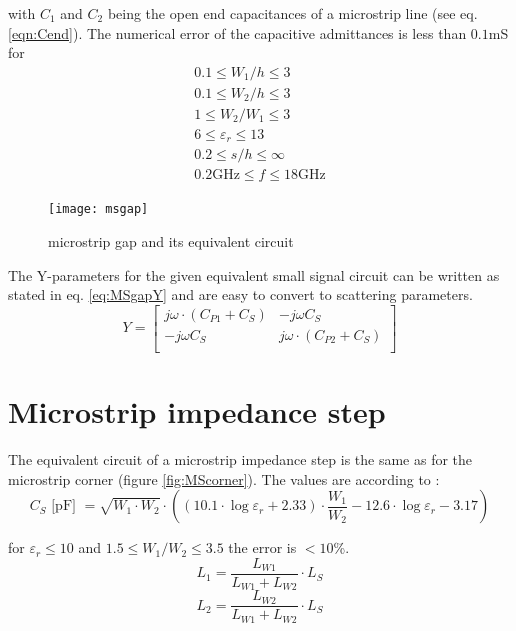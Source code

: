 \documentclass[10pt]{report}
\begin{document}
with $C_1$ and $C_2$ being the open end capacitances of a microstrip
line (see eq. \eqref{eqn:Cend}).  The numerical error of the
capacitive admittances is less than $0.1$mS for
\begin{equation*}
\begin{split}
0.1\le W_1/h \le 3 \\
0.1\le W_2/h \le 3 \\
1\le W_2/W_1 \le 3 \\
6\le \varepsilon_r \le 13 \\
0.2\le s/h \le \infty \\
0.2\text{GHz} \le f \le 18\text{GHz}
\end{split}
\end{equation*}

\begin{figure}[ht]
\begin{center}
\texttt{[image: msgap]}
\end{center}
\caption{microstrip gap and its equivalent circuit}
\label{fig:MSgap}
\end{figure}
\FloatBarrier

The Y-parameters for the given equivalent small signal circuit can be
written as stated in eq. \eqref{eq:MSgapY} and are easy to convert to
scattering parameters.
\begin{equation}
Y =
\begin{bmatrix}
j\omega\cdot \left(C_{P1} + C_S\right) & -j\omega C_S\\
-j\omega C_S & j\omega\cdot \left(C_{P2} + C_S\right)\\
\end{bmatrix}
\label{eq:MSgapY}
\end{equation}

\section{Microstrip impedance step}

The equivalent circuit of a microstrip impedance step is the same as
for the microstrip corner (figure \ref{fig:MScorner}).  The values are
according to \cite{Gupta}:
\begin{equation}
C_S \textrm{ [pF] } = \sqrt{W_1\cdot W_2}\cdot\left( (10.1\cdot\log{\varepsilon_r} + 2.33)\cdot
     \dfrac{W_1}{W_2} - 12.6\cdot\log{\varepsilon_r} - 3.17 \right)
\end{equation}

for $\varepsilon_r\le 10$ and $1.5\le W_1/W_2\le 3.5$ the error is
$<10$\%.
\begin{equation}
L_1 = \frac{L_{W1}}{L_{W1}+L_{W2}}\cdot L_S
\end{equation}
\begin{equation}
L_2 = \frac{L_{W2}}{L_{W1}+L_{W2}}\cdot L_S
\end{equation}
\end{document}
